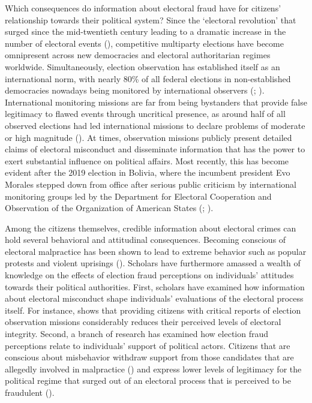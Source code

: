 \documentclass[11pt, ngerman,english,a4]{article}
\begin{document}
Which consequences do information about electoral fraud have for citizens' relationship towards their political system? Since the `electoral revolution’ that surged since the mid-twentieth century leading to a dramatic increase in the number of electoral events (\citealt{Norris2014}), competitive multiparty elections have become omnipresent across new democracies and electoral authoritarian regimes worldwide. Simultaneously, election observation has established itself as an international norm, with nearly 80\% of all federal elections in non-established democracies nowadays being monitored by international observers (\citealt{Kelley2012a}; \citealt{Hyde2011}). International monitoring missions are far from being bystanders that provide false legitimacy to flawed events through uncritical presence, as around half of all observed elections had led international missions to declare problems of moderate or high magnitude (\citealt{Kelley2012a, Kelley2012b}). At times, observation missions publicly present detailed claims of electoral misconduct and disseminate information that has the power to exert substantial influence on political affairs. Most recently, this has become evident after the 2019 election in Bolivia, where the incumbent president Evo Morales stepped down from office after serious public criticism by international monitoring groups led by the Department for Electoral Cooperation and Observation of the Organization of American States (\citealt{OAS2019}; \citealt{Idrobo2020}). 

Among the citizens themselves, credible information about electoral crimes can hold several behavioral and attitudinal consequences. Becoming conscious of electoral malpractice has been shown to lead to extreme behavior such as popular protests and violent uprisings (\citealt{Daxecker2012}). Scholars have furthermore amassed a wealth of knowledge on the effects of election fraud perceptions on individuals' attitudes towards their political authorities. First, scholars have examined how information about electoral misconduct shape individuals' evaluations of the electoral process itself.  For instance, \citet{Robertson2017} shows that providing citizens with critical reports of election observation missions considerably reduces their perceived levels of electoral integrity. Second, a branch of research has examined how election fraud perceptions relate to individuals' support of political actors. Citizens that are conscious about misbehavior withdraw support from those candidates that are allegedly involved in malpractice (\citealt{Reuter2019}) and express lower levels of legitimacy for the political regime that surged out of an electoral process that is perceived to be fraudulent (\citealt{Williamson2020}).
\end{document}
